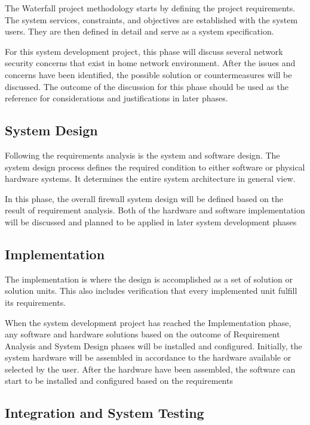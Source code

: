 \documentclass[../index.tex]{subfiles}
\begin{document}
The Waterfall project methodology starts by defining the project requirements. The system
services, constraints, and objectives are established with the system users. They are then defined
in detail and serve as a system specification.

For this system development project, this phase will discuss several network security concerns that
exist in home network environment. After the issues and concerns have been identified, the possible
solution or countermeasures will be discussed. The outcome of the discussion for this phase should
be used as the reference for considerations and justifications in later phases.

\subsection{System Design}

Following the requirements analysis is the system and software design. The
system design process defines the required condition to either software or physical
hardware systems. It determines the entire system architecture in general view.

In this phase, the overall firewall system design will be defined based on the
result of requirement analysis. Both of the hardware and software implementation will
be discussed and planned to be applied in later system development phases

\subsection{Implementation}

The implementation is where the design is accomplished as a set of solution or
solution units. This also includes verification that every implemented unit fulfill its
requirements.

When the system development project has reached the Implementation phase,
any software and hardware solutions based on the outcome of Requirement Analysis
and System Design phases will be installed and configured. Initially, the system
hardware will be assembled in accordance to the hardware available or selected by the
user. After the hardware have been assembled, the software can start to be installed
and configured based on the requirements


\subsection{Integration and System Testing}
\end{document}
